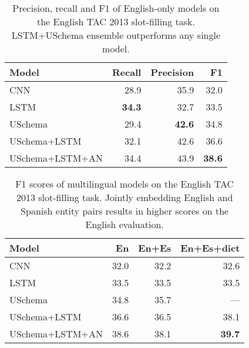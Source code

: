 \begin{table}[tb]
\begin{center}
\caption{Precision, recall and F1 of English-only models on the English TAC 2013 slot-filling task. LSTM+USchema ensemble outperforms any single model. \label{en-tac-table}}
\begin{tabular}{|lrrr|}
\hline
\bf Model & \bf Recall & \bf Precision & \bf F1 \\
\hline\hline
CNN                 & 28.9 & 35.9 & 32.0 \\
LSTM                & \bf 34.3 & 32.7 & 33.5  \\
USchema             & 29.4 & \bf 42.6 & 34.8 \\
\hline
USchema+LSTM        & 32.1 & 42.6 & 36.6 \\
USchema+LSTM+AN	& 34.4 & 43.9 & \bf 38.6 \\
\hline
\end{tabular}
\end{center}
\end{table}

\begin{table}[tb]
\begin{center}
\caption{F1 scores of multilingual models on the English TAC 2013 slot-filling task. Jointly embedding English and Spanish entity pairs results in higher scores on the English evaluation. \label{en-es-tac-table}}
\tabcolsep=0.15cm
\begin{tabular}{|lrrr|}
\hline
\bf Model & \bf En & \bf En+Es & \bf En+Es+dict  \\
\hline\hline
CNN  & 32.0 & 32.2 & 32.6	 \\
LSTM & 33.5 & 33.5 & 33.5 \\
USchema & 34.8 & 35.7  & --- \\
\hline
USchema+LSTM & 36.6 & 36.5 & 38.1 \\
USchema+LSTM+AN & 38.6 & 38.1  & \bf 39.7 \\
\hline
\end{tabular}
\end{center}

\end{table}

